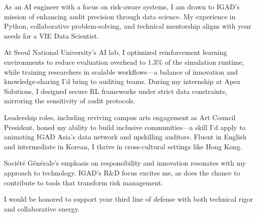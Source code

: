 
\newcommand{\Company}{Corsearch}
\recipient{\RecruitmentTeam{\Company}}{\Company\\Paris\\ France}
\date{April 5 2025}
\makelettertitle

As an AI engineer with a focus on risk-aware systems, I am drawn to IGAD’s mission of enhancing audit precision through data science. My experience in Python, collaborative problem-solving, and technical mentorship aligns with your needs for a VIE Data Scientist.

At Seoul National University’s AI lab, I optimized reinforcement learning environments to reduce evaluation overhead to 1.3\% of the simulation runtime, while training researchers in scalable workflows—a balance of innovation and knowledge-sharing I’d bring to auditing teams. During my internship at Apex Solutions, I designed secure RL frameworks under strict data constraints, mirroring the sensitivity of audit protocols.

Leadership roles, including reviving campus arts engagement as Art Council President, honed my ability to build inclusive communities—a skill I’d apply to animating IGAD Asia’s data network and upskilling auditors. Fluent in English and intermediate in Korean, I thrive in cross-cultural settings like Hong Kong.

Société Générale’s emphasis on responsibility and innovation resonates with my approach to technology. IGAD’s R\&D focus excites me, as does the chance to contribute to tools that transform risk management.

I would be honored to support your third line of defense with both technical rigor and collaborative energy.


\makeletterclosing
